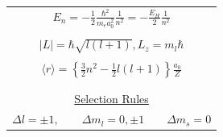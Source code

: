\documentclass[11pt]{article}
\begin{document}
\begin{table}[]
\begin{center}
\begin{tabular}[h]{|c|}
\\
$\displaystyle     E_{n}=-\frac{1}{2}\frac{\hbar^2}{m_e a_0^2}\frac{1}{n^2} =-\frac{E_H}{2}\frac{1}{n^2}$ \\
 \\
$\displaystyle |L| = \hbar \sqrt{l(l+1)}, L_z = m_l \hbar $ \\
\\
$\displaystyle \langle r \rangle = \left \{ \frac{3}{2} n^2 - \frac{1}{2} l(l+1) \right \} \frac{a_0}{Z} $ \\
\\
\\ \underline{Selection Rules} \\
$\displaystyle \Delta l = \pm 1, \qquad  \Delta m_l = 0, \pm 1\qquad \Delta m_s=0 $
\\
\hline
\end{tabular}
 \end{center}
\end{table}
\end{document}
